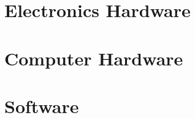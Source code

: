 \documentclass[12pt]{article}
\begin{document}
\section{Electronics Hardware}\label{sec:ee-hardware}

\section{Computer Hardware}\label{sec:cs-hardware}

\section{Software}\label{sec:software}
\end{document}
